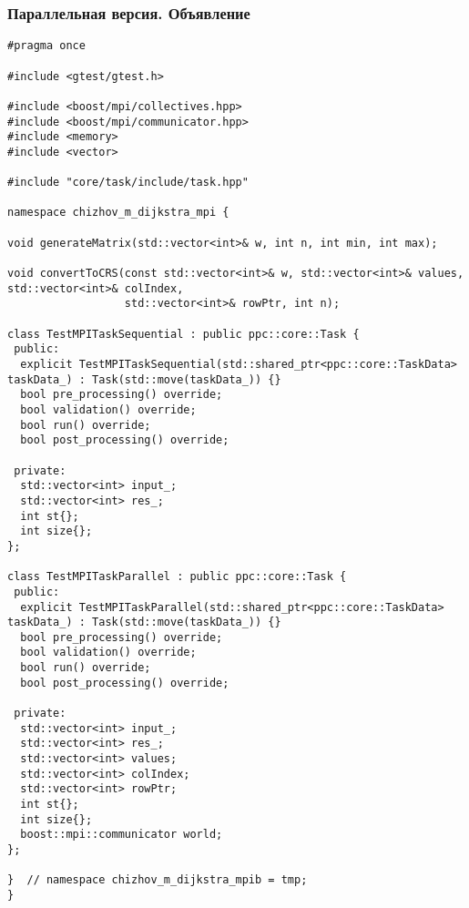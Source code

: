 \documentclass[a4paper, 14pt]{extarticle}
\begin{document}
\subsubsection{Параллельная версия. Объявление}
\begin{lstlisting}
#pragma once

#include <gtest/gtest.h>

#include <boost/mpi/collectives.hpp>
#include <boost/mpi/communicator.hpp>
#include <memory>
#include <vector>

#include "core/task/include/task.hpp"

namespace chizhov_m_dijkstra_mpi {

void generateMatrix(std::vector<int>& w, int n, int min, int max);

void convertToCRS(const std::vector<int>& w, std::vector<int>& values, std::vector<int>& colIndex,
                  std::vector<int>& rowPtr, int n);

class TestMPITaskSequential : public ppc::core::Task {
 public:
  explicit TestMPITaskSequential(std::shared_ptr<ppc::core::TaskData> taskData_) : Task(std::move(taskData_)) {}
  bool pre_processing() override;
  bool validation() override;
  bool run() override;
  bool post_processing() override;

 private:
  std::vector<int> input_;
  std::vector<int> res_;
  int st{};
  int size{};
};

class TestMPITaskParallel : public ppc::core::Task {
 public:
  explicit TestMPITaskParallel(std::shared_ptr<ppc::core::TaskData> taskData_) : Task(std::move(taskData_)) {}
  bool pre_processing() override;
  bool validation() override;
  bool run() override;
  bool post_processing() override;

 private:
  std::vector<int> input_;
  std::vector<int> res_;
  std::vector<int> values;
  std::vector<int> colIndex;
  std::vector<int> rowPtr;
  int st{};
  int size{};
  boost::mpi::communicator world;
};

}  // namespace chizhov_m_dijkstra_mpib = tmp;
}
\end{lstlisting}

\newpage
\end{document}
